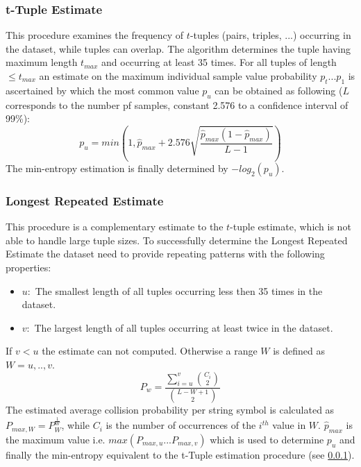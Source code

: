\subsubsection{t-Tuple Estimate}\label{non-iid-est:tte}
This procedure examines the frequency of $t$-tuples (pairs, triples, ...) occurring in the dataset, while tuples can overlap. The algorithm determines the tuple having maximum length $t_{max}$ and occurring at least 35 times. For all tuples of length $\le t_{max}$ an estimate on the maximum individual sample value probability $p_{t} ... p_{1}$ is ascertained by which the most common value $p_u$ can be obtained as following ($L$ corresponds to the number pf samples, constant 2.576 to a confidence interval of 99\%):
\begin{equation}
p_u = min\left(1,\hat{p}_{max} + 2.576 \sqrt{\frac{\hat{p}_{max}(1-\hat{p}_{max})}{L-1}}\right)
\end{equation}
The min-entropy estimation is finally determined by $-log_2(p_u)$.

\subsubsection{Longest Repeated Estimate}\label{non-iid-est:lrs}
This procedure is a complementary estimate to the $t$-tuple estimate, which is not able to handle large tuple sizes. To successfully determine the Longest Repeated Estimate the dataset need to provide repeating patterns with the following properties:
\begin{itemize}
	\item $u:$ The smallest length of all tuples occurring less then 35 times in the dataset.
	\item $v:$ The largest length of all tuples occurring at least twice in the dataset.
\end{itemize}
If $v < u$ the estimate can not computed. Otherwise a range $W$ is defined as $W = {u,..,v}$.
\begin{equation}
	P_w = \frac{\displaystyle\sum_{i=u}^{v}\binom{C_i}{2}}{\binom{L-W+1}{2}}
\end{equation}
The estimated average collision probability per string symbol is calculated as $P_{max,W} = P_{W}^{\frac{1}{W}}$, while $C_i$ is the number of occurrences of the $i^{th}$ value in $W$. 
$\hat{p}_{max}$ is the maximum value i.e. $max(P_{max,u}...P_{max,v})$ which is used to determine $p_u$ and finally the min-entropy equivalent to the t-Tuple estimation procedure (see \ref{non-iid-est:tte}).

